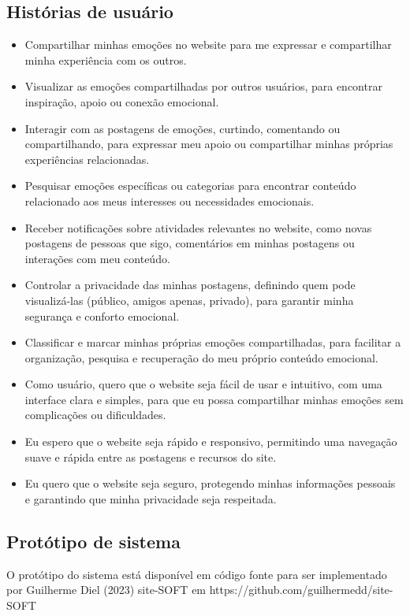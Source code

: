 \documentclass[12pt]{article}
\begin{document}
\subsection{Histórias de usuário} %
\begin{itemize}
  \item Compartilhar minhas emoções no website para me expressar e compartilhar minha experiência com os outros.
  \item Visualizar as emoções compartilhadas por outros usuários, para encontrar inspiração, apoio ou conexão emocional.
  \item Interagir com as postagens de emoções, curtindo, comentando ou compartilhando, para expressar meu apoio ou compartilhar minhas próprias experiências relacionadas.
  \item Pesquisar emoções específicas ou categorias para encontrar conteúdo relacionado aos meus interesses ou necessidades emocionais.
  \item Receber notificações sobre atividades relevantes no website, como novas postagens de pessoas que sigo, comentários em minhas postagens ou interações com meu conteúdo.
  \item Controlar a privacidade das minhas postagens, definindo quem pode visualizá-las (público, amigos apenas, privado), para garantir minha segurança e conforto emocional.
  \item Classificar e marcar minhas próprias emoções compartilhadas, para facilitar a organização, pesquisa e recuperação do meu próprio conteúdo emocional.
  \item Como usuário, quero que o website seja fácil de usar e intuitivo, com uma interface clara e simples, para que eu possa compartilhar minhas emoções sem complicações ou dificuldades.
  \item Eu espero que o website seja rápido e responsivo, permitindo uma navegação suave e rápida entre as postagens e recursos do site.
  \item Eu quero que o website seja seguro, protegendo minhas informações pessoais e garantindo que minha privacidade seja respeitada.
\end{itemize}
\subsection{Protótipo de sistema}
  O protótipo do sistema está disponível em código fonte para ser 
  implementado por Guilherme Diel (2023) site-SOFT em https://github.com/guilhermedd/site-SOFT 
\end{document}
